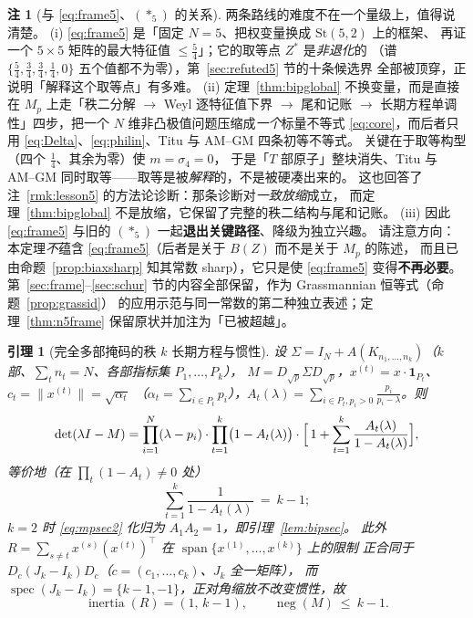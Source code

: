 \documentclass[UTF8,11pt]{ctexart}
\newtheorem{lemma}[theorem]{引理}
\theoremstyle{definition}
\newtheorem{remark}[theorem]{注}
\begin{document}
\begin{remark}[与 \eqref{eq:frame5}、$(\ast_5)$ 的关系]\label{rmk:bipvsframe}
两条路线的难度不在一个量级上，值得说清楚。
(i) \eqref{eq:frame5} 是「固定 $N=5$、把权变量换成 $\mathrm{St}(5,2)$ 上的框架、
再证一个 $5\times5$ 矩阵的最大特征值 $\le\frac54$」；它的取等点 $Z^\ast$ 是\emph{非退化}的
（谱 $\{\frac54,\frac34,\frac34,\frac14,0\}$ 五个值都不为零），第~\ref{sec:refuted5} 节的十条候选界
全部被顶穿，正说明「解释这个取等点」有多难。
(ii) 定理~\ref{thm:bipglobal} 不换变量，而是直接在 $M_p$ 上走「秩二分解 $\to$ Weyl 逐特征值下界
$\to$ 尾和记账 $\to$ 长期方程单调性」四步，把一个 $N$ 维非凸极值问题压缩成\emph{一个}标量不等式
\eqref{eq:core}，而后者只用 \eqref{eq:Delta}、\eqref{eq:philin}、Titu 与 AM--GM 四条初等不等式。
关键在于取等构型（四个 $\frac14$、其余为零）使 $m=\sigma_4=0$，
于是「$T$ 部原子」整块消失、Titu 与 AM--GM 同时取等——取等是被\emph{解释}的，不是被硬凑出来的。
这也回答了注~\ref{rmk:lesson5} 的方法论诊断：那条诊断对\emph{一致放缩}成立，
而定理~\ref{thm:bipglobal} 不是放缩，它保留了完整的秩二结构与尾和记账。
(iii) 因此 \eqref{eq:frame5} 与旧的 $(\ast_5)$ 一起\textbf{退出关键路径}、降级为独立兴趣。
请注意方向：本定理\emph{不}蕴含 \eqref{eq:frame5}（后者是关于 $B(Z)$ 而不是关于 $M_p$ 的陈述，
而且已由命题~\ref{prop:biaxsharp} 知其常数 sharp），它只是使 \eqref{eq:frame5} 变得\textbf{不再必要}。
第~\ref{sec:frame}--\ref{sec:schur} 节的内容全部保留，作为 Grassmannian 恒等式（命题~\ref{prop:grassid}）
的应用示范与同一常数的第二种独立表述；定理~\ref{thm:n5frame} 保留原状并加注为「已被超越」。
\end{remark}

\begin{lemma}[完全多部掩码的秩 $k$ 长期方程与惯性]\label{lem:mpsec}
设 $\Sigma=I_N+A(K_{n_1,\dots,n_k})$（$k$ 部、$\sum_{t}n_t=N$、各部指标集 $P_1,\dots,P_k$），
$M=D_{\sqrt p}\Sigma D_{\sqrt p}$，$x^{(t)}=x\cdot\mathbf 1_{P_t}$、$c_t=\|x^{(t)}\|=\sqrt{\alpha_t}$
（$\alpha_t=\sum_{i\in P_t}p_i$），$A_t(\lambda)=\sum_{i\in P_t,p_i>0}\frac{p_i}{p_i-\lambda}$。则
\begin{equation}\label{eq:mpsec}
\det(\lambda I-M)=\prod_{i=1}^{N}(\lambda-p_i)\cdot\prod_{t=1}^{k}\bigl(1-A_t(\lambda)\bigr)
\cdot\Bigl[\,1+\sum_{t=1}^{k}\frac{A_t(\lambda)}{1-A_t(\lambda)}\Bigr],
\end{equation}
等价地（在 $\prod_t(1-A_t)\ne0$ 处）
\begin{equation}\label{eq:mpsec2}
\sum_{t=1}^{k}\frac{1}{1-A_t(\lambda)}\ =\ k-1 ;
\end{equation}
$k=2$ 时 \eqref{eq:mpsec2} 化归为 $A_1A_2=1$，即引理~\ref{lem:bipsec}。
此外 $R=\sum_{s\ne t}x^{(s)}(x^{(t)})^\top$ 在 $\operatorname{span}\{x^{(1)},\dots,x^{(k)}\}$ 上的限制
正合同于 $D_c(J_k-I_k)D_c$（$c=(c_1,\dots,c_k)$、$J_k$ 全一矩阵），
而 $\operatorname{spec}(J_k-I_k)=\{k-1,-1\}$，正对角缩放不改变惯性，故
\begin{equation}\label{eq:mpinertia}
\operatorname{inertia}(R)=(1,\,k-1),\qquad \operatorname{neg}(M)\ \le\ k-1 .
\end{equation}
\end{lemma}
\end{document}

